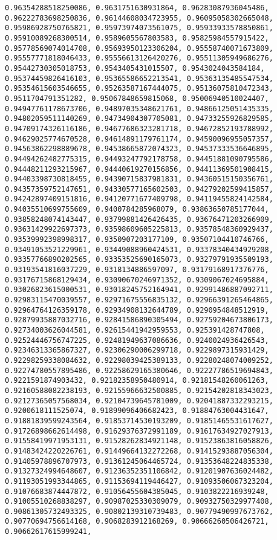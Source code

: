 \documentclass[11pt]{article}
\begin{document}
\begin{Verbatim}[commandchars=\\\{\}]
0.96354288518250086, 0.9631751630931864, 0.96283087936045486, 0.96222783698250836, 0.96144608034723955, 0.96095058302665048, 0.95986928750765821, 0.95973974073561075, 0.95933933578850861, 0.95910089268300514, 0.9589605567803583, 0.95825984557915422, 0.95778569074014708, 0.95693950123306204, 0.95558740071673809, 0.95557771818046433, 0.95556613126420276, 0.95511305949686276, 0.95442730305018753, 0.9543405431015507, 0.9543024043584184, 0.95374459826416103, 0.95365586652213541, 0.95363135485547534, 0.95354615603546655, 0.95263587167444075, 0.95136075810472343, 0.9511704791351282, 0.95067848659815068, 0.95006940510024407, 0.94947761178673706, 0.94897035348621761, 0.94866125051435335, 0.94802059511140269, 0.94734904307705081, 0.94733255926829585, 0.94709174326116186, 0.94677686323281718, 0.94672852193788992, 0.94629025774670528, 0.94614891179761174, 0.94590096955057357, 0.94563862298889678, 0.94538665872074323, 0.94537333536646895, 0.94494262482775315, 0.94493247792178758, 0.94451881090795586, 0.94448211293215967, 0.94440619270156856, 0.94411369501908415, 0.94403398730818455, 0.94390715837981831, 0.94360515150356761, 0.94357359752147651, 0.94330577165602503, 0.94279202599415857, 0.94242897409151816, 0.94120771677409798, 0.94119455824142584, 0.94035510699755609, 0.9400784285968079, 0.93863650785177044, 0.93858248074143447, 0.93799881426426435, 0.93676471203266909, 0.93631429922697373, 0.93598609605225813, 0.93578548360929437, 0.93539992398998317, 0.9350907203177109, 0.93507104410746766, 0.93491053521229961, 0.93449088960424531, 0.93378340434929208, 0.93357766890202565, 0.93353525690165073, 0.93279791935509193, 0.93193541816037229, 0.9318134886597097, 0.93179168917376776, 0.93176715868129434, 0.93090670246971352, 0.9309067024695884, 0.93026823615000531, 0.93018245752164941, 0.92991486887092711, 0.92983115470039557, 0.92971675556835132, 0.92966391265464865, 0.92964764126359178, 0.92934908132644789, 0.9290954848512919, 0.92879935887032716, 0.92841586890305494, 0.92759204673806173, 0.92734003626044581, 0.92615441942959553, 0.925391428747808, 0.92524446756747225, 0.92481949637086636, 0.9240024936426543, 0.92346313365867327, 0.92306290006299718, 0.9229897315931429, 0.92298259338084632, 0.92298039425389133, 0.92280248074009252, 0.92274780557895486, 0.92258629165380646, 0.92227786519694843, 0.9221591874903432, 0.92182358950480914, 0.92181548260061263, 0.92160588082238193, 0.92155966632500885, 0.92154202818343023, 0.92127365057568034, 0.92104739645781009, 0.92041887332293215, 0.9200618111525074, 0.91899096406682423, 0.91884763004431647, 0.91881839599243564, 0.91853714530193209, 0.91851465531617627, 0.91726898662614498, 0.91629376372991189, 0.91617634927027913, 0.91558419971953131, 0.91528262834921148, 0.91523863816058826, 0.91483424220226761, 0.91449664132272268, 0.91415293887056304, 0.91405978896707973, 0.91361245064465724, 0.91353648224835338, 0.91327324994648607, 0.91236352351106842, 0.91201907636024482, 0.91193051993344865, 0.91153694119446427, 0.91093506067323204, 0.91076683874447872, 0.91056455604385045, 0.9103822216939248, 0.91005510268838297, 0.90987025330309079, 0.90932750329977408, 0.90861305732493325, 0.90802139310739483, 0.90779490997673762, 0.90770694756614168, 0.9068283912168269, 0.90666260506426721, 0.90662617615999241, 
\end{Verbatim}
\end{document}
